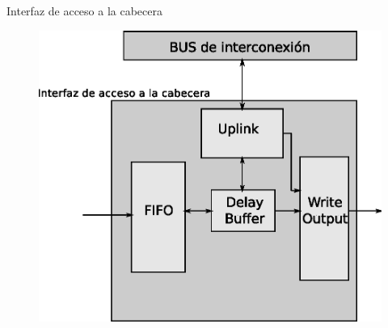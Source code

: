 \documentclass[xcolor=dvipsnames]{beamer}
\begin{document}
\begin{frame}{Interfaz de acceso a la cabecera}
\begin{figure}
\centering 
\includegraphics[scale=0.60]{figures/modulo.eps}
\end{figure}
\end{frame}
\end{document}
